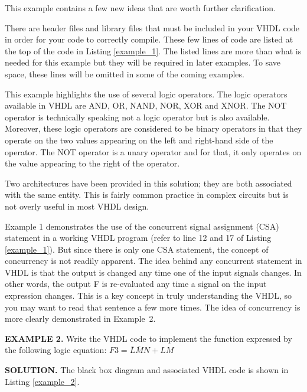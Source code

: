 This example contains a few new ideas that are worth further clarification.
\begin{my_list}
\item There are header files and library files that must be included in your VHDL code in order for your code to correctly compile. These few lines of code are listed at the top of the code in Listing \ref{example_1}. The listed lines are more than what is needed for this example but they will be required in later examples. To save space, these lines will be omitted in some of the coming examples.
\item This example highlights the use of several logic operators. The logic operators available in VHDL are AND, OR, NAND, NOR, XOR and XNOR. The NOT operator is technically speaking not a logic operator but is also available. Moreover, these logic operators are considered to be binary operators in that they operate on the two values appearing on the left and right-hand side of the operator. The NOT operator is a unary operator and for that, it only operates on the value appearing to the right of the operator.
\item Two architectures have been provided in this solution; they are both associated with the same entity. This is fairly common practice in complex circuits but is not overly useful in most VHDL design.
\end{my_list}
Example 1 demonstrates the use of the concurrent signal assignment (CSA) statement in a working VHDL program (refer to line 12 and 17 of Listing \ref{example_1}). But since there is only one CSA statement, the concept of concurrency is not readily apparent. The idea behind any concurrent statement in VHDL is that the output is changed any time one of the input signals changes. In other words, the output F is re-evaluated any time a signal on the input expression changes. This is a key concept in truly understanding the VHDL, so you may want to read that sentence a few more times. The idea of concurrency is more clearly demonstrated in Example~2.

\begin{leftbar}
\noindent
\textbf{EXAMPLE 2.}
Write the VHDL code to implement the function expressed by the following logic equation: $F3=\overline{L}\overline{M}N+LM$
\end{leftbar}
\noindent
\textbf{SOLUTION.} The black box diagram and associated VHDL code is shown in Listing \ref{example_2}.

